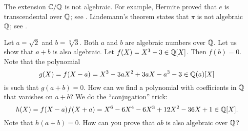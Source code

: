 The extension $\mathbb{C}/\mathbb{Q}$ is not algebraic. For example, Hermite proved 
that $e$ is transcendental 
over $\mathbb{Q}$; see \cite[Therem 24.4]{MR3379917}. Lindemann's theorem 
states that $\pi$ is 
not algebraic $\mathbb{Q}$; see \cite[Theorem 24.5]{MR3379917}. 

\begin{example}
\label{exa:two_algebraics}
    Let $a=\sqrt{2}$ and $b=\sqrt[3]{3}$. Both $a$ and $b$ are algebraic numbers over $\mathbb{Q}$. 
    Let us show that $a+b$ is also algebraic. Let $f(X)=X^3-3\in\mathbb{Q}[X]$. Then $f(b)=0$. Note
    that the polynomial 
    \[
    g(X)=f(X-a)=X^3-3aX^2+3aX-a^3-3\in\mathbb{Q}(a)[X]
    \]
    is such that $g(a+b)=0$. How can we find a polynomial 
    with coefficients in $\mathbb{Q}$ that vanishes on $a+b$? We do the ``conjugation'' trick:
    \[
    h(X)=f(X-a)f(X+a)=X^6-6X^4-6X^3+12X^2-36X+1\in\mathbb{Q}[X].
    \]
    Note that $h(a+b)=0$. How can you prove that $ab$ is also algebraic over $\mathbb{Q}$?     
\end{example}
